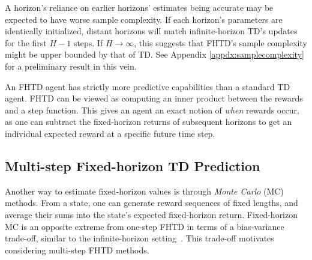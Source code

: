 \documentclass[letterpaper]{article} %
\newcommand{\TODO}[1]{\textcolor{red}{#1}}
\begin{document}
A horizon's reliance on earlier horizons' estimates being accurate may be expected to have worse sample complexity. If each horizon's parameters are identically initialized, distant horizons will match infinite-horizon TD's updates for the first $H - 1$ steps. If $H\rightarrow\infty$, this suggests that FHTD's sample complexity might be upper bounded by that of TD. See Appendix \ref{appdx:samplecomplexity} for a preliminary result in this vein.

An FHTD agent has strictly more predictive capabilities than a standard TD agent. FHTD can be viewed as computing an inner product between the rewards and a step function. This gives an agent an exact notion of \textit{when} rewards occur, as one can subtract the fixed-horizon returns of subsequent horizons to get an individual expected reward at a specific future time step. %

\subsection{Multi-step Fixed-horizon TD Prediction}
\label{sec:nstepfhtd}

Another way to estimate fixed-horizon values is through \textit{Monte Carlo} (MC) methods. From a state, one can generate reward sequences of fixed lengths, and average their sums into the state's expected fixed-horizon return. Fixed-horizon MC is an opposite extreme from one-step FHTD in terms of a bias-variance trade-off, similar to the infinite-horizon setting~\cite{multistepbiasvar1994}. This trade-off motivates considering multi-step FHTD methods.
\end{document}
